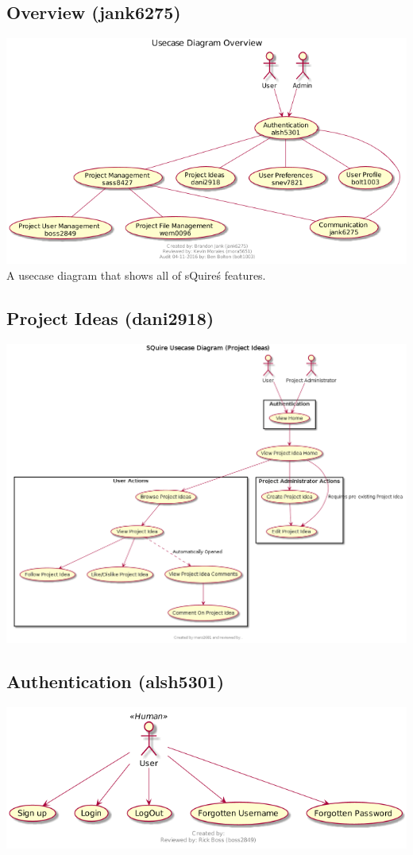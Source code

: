 \documentclass[11pt]{report}
\begin{document}
    \subsection{Overview (jank6275)}
        \includegraphics[width=\textwidth]{diagrams/usecase-overview}
        A usecase diagram that shows all of sQuire\'s features.
    \subsection{Project Ideas (dani2918)}
        \includegraphics[width=\textwidth]{diagrams/usecase-projectideas}
    \subsection{Authentication (alsh5301)}
        \includegraphics[width=\textwidth]{diagrams/usecase-authentication}
\end{document}
